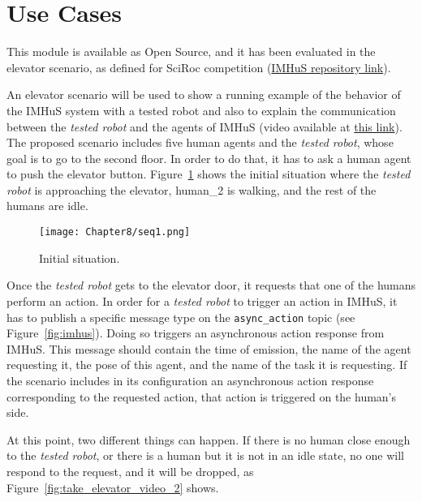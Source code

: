 \section{Use Cases}
\label{sec:useCases}


This module is available as Open Source, and it has been evaluated in the elevator scenario, as defined for SciRoc competition (\href{https://github.com/LAAS-HRI/IMHuS}{IMHuS repository link}). %

An elevator scenario will be used to show a running example of the behavior of the IMHuS system with a tested robot and also to explain the communication between the \textit{tested robot} and the agents of IMHuS (video available at \href{https://github.com/LAAS-HRI/IMHuS/videos}{this link}). The proposed scenario includes five human agents and the \textit{tested robot}, whose goal is to go to the second floor. In order to do that, it has to ask a human agent to push the elevator button. Figure~\ref{fig:take_elevator_video_1} shows the initial situation where the \textit{tested robot} is approaching the elevator, human\_2 is walking, and the rest of the humans are idle.

\begin{figure}[!ht]
  \centering
  {\texttt{[image: Chapter8/seq1.png]}}\\
  \caption{Initial situation.}
  \label{fig:take_elevator_video_1}
\end{figure}

Once the \textit{tested robot} gets to the elevator door, it requests that one of the humans perform an action. In order for a \textit{tested robot} to trigger an action in IMHuS, it has to publish a specific message type on the \texttt{async\_action} topic (see Figure~\ref{fig:imhus}). Doing so triggers an asynchronous action response from IMHuS. This message should contain the time of emission, the name of the agent requesting it, the pose of this agent, and the name of the task it is requesting. If the scenario includes in its configuration an asynchronous action response corresponding to the requested action, that action is triggered on the human's side.

At this point, two different things can happen. If there is no human close enough to the \textit{tested robot}, or there is a human but it is not in an idle state, no one will respond to the request, and it will be dropped, as Figure~\ref{fig:take_elevator_video_2} shows.

